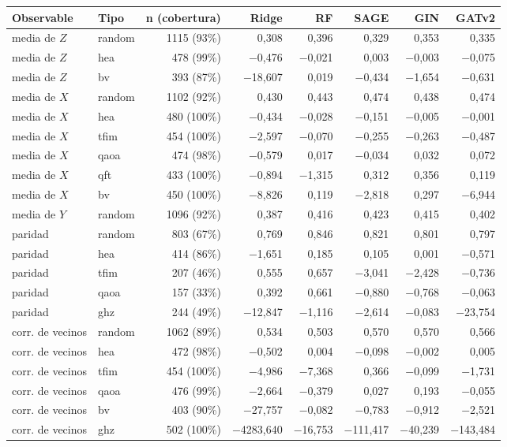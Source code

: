 \begin{table}[htbp]
    \centering
    {\footnotesize
    \begin{tabular}{@{}llrrrrrr@{}}
        \toprule
        \textbf{Observable} & \textbf{Tipo} & \textbf{n (cobertura)} & \textbf{Ridge} & \textbf{RF} & \textbf{SAGE} & \textbf{GIN} & \textbf{GATv2} \\
        \midrule
        media de $Z$ & random & 1115 (93\%) & 0,308 & 0,396 & 0,329 & 0,353 & 0,335 \\
        media de $Z$ & hea & 478 (99\%) & $-$0,476 & $-$0,021 & 0,003 & $-$0,003 & $-$0,075 \\
        media de $Z$ & bv & 393 (87\%) & $-$18,607 & 0,019 & $-$0,434 & $-$1,654 & $-$0,631 \\
        media de $X$ & random & 1102 (92\%) & 0,430 & 0,443 & 0,474 & 0,438 & 0,474 \\
        media de $X$ & hea & 480 (100\%) & $-$0,434 & $-$0,028 & $-$0,151 & $-$0,005 & $-$0,001 \\
        media de $X$ & tfim & 454 (100\%) & $-$2,597 & $-$0,070 & $-$0,255 & $-$0,263 & $-$0,487 \\
        media de $X$ & qaoa & 474 (98\%) & $-$0,579 & 0,017 & $-$0,034 & 0,032 & 0,072 \\
        media de $X$ & qft & 433 (100\%) & $-$0,894 & $-$1,315 & 0,312 & 0,356 & 0,119 \\
        media de $X$ & bv & 450 (100\%) & $-$8,826 & 0,119 & $-$2,818 & 0,297 & $-$6,944 \\
        media de $Y$ & random & 1096 (92\%) & 0,387 & 0,416 & 0,423 & 0,415 & 0,402 \\
        paridad & random & 803 (67\%) & 0,769 & 0,846 & 0,821 & 0,801 & 0,797 \\
        paridad & hea & 414 (86\%) & $-$1,651 & 0,185 & 0,105 & 0,001 & $-$0,571 \\
        paridad & tfim & 207 (46\%) & 0,555 & 0,657 & $-$3,041 & $-$2,428 & $-$0,736 \\
        paridad & qaoa & 157 (33\%) & 0,392 & 0,661 & $-$0,880 & $-$0,768 & $-$0,063 \\
        paridad & ghz & 244 (49\%) & $-$12,847 & $-$1,116 & $-$2,614 & $-$0,083 & $-$23,754 \\
        corr. de vecinos & random & 1062 (89\%) & 0,534 & 0,503 & 0,570 & 0,570 & 0,566 \\
        corr. de vecinos & hea & 472 (98\%) & $-$0,502 & 0,004 & $-$0,098 & $-$0,002 & 0,005 \\
        corr. de vecinos & tfim & 454 (100\%) & $-$4,986 & $-$7,368 & 0,366 & $-$0,099 & $-$1,731 \\
        corr. de vecinos & qaoa & 476 (99\%) & $-$2,664 & $-$0,379 & 0,027 & 0,193 & $-$0,055 \\
        corr. de vecinos & bv & 403 (90\%) & $-$27,757 & $-$0,082 & $-$0,783 & $-$0,912 & $-$2,521 \\
        corr. de vecinos & ghz & 502 (100\%) & $-$4283,640 & $-$16,753 & $-$111,417 & $-$40,239 & $-$143,484 \\
        \bottomrule
    \end{tabular}}


\end{table}
